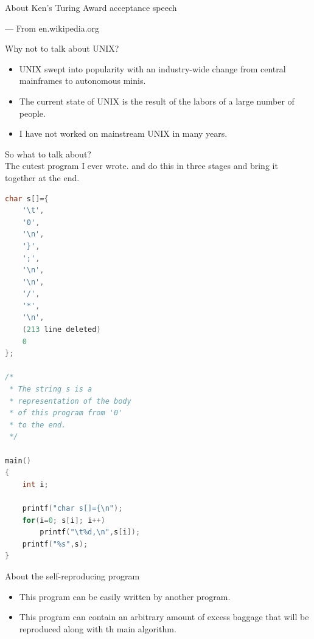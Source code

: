 \documentclass[CJK]{beamer}
\begin{document}
\begin{CJK*}{UTF8}{gbsn}
\begin{frame}{About Ken's Turing Award acceptance speech}
\begin{flushright}
	--- From en.wikipedia.org
	\end{flushright}
\end{frame}
\begin{frame}{Why not to talk about UNIX?}
	\begin{itemize}
		\item UNIX swept into popularity with an industry-wide change from central mainframes to autonomous minis.
		\item The current state of UNIX is the result of the labors of a large number of people.
		\item I have not worked on mainstream UNIX in many years.
	\end{itemize}
	\begin{block}{}
	\begin{center}
	So what to talk about?\\
	The cutest program I ever wrote. and do this in three stages and bring it together at the end.
	\end{center}
	\end{block}
\end{frame}

{\tiny
\begin{lstlisting}[language=C,caption=Stage I "a self-reproducing program",label=ccode,keywordstyle=\color{blue!70}, commentstyle=\color{red!50!green!50!blue!50}, frame=shadowbox, rulesepcolor=\color{red!20!green!20!blue!20}]
char s[]={
	'\t',
	'0',
	'\n',
	'}',
	';',
	'\n',
	'\n',
	'/',
	'*',
	'\n',
	(213 line deleted)
	0
};

/*
 * The string s is a
 * representation of the body
 * of this program from '0'
 * to the end.
 */

main()
{
	int i;
	
	printf("char s[]={\n");
	for(i=0; s[i]; i++)
		printf("\t%d,\n",s[i]);
	printf("%s",s);
}
\end{lstlisting}
}

\begin{frame}{About the self-reproducing program}
	\begin{itemize}
		\item This program can be easily written by another program.
		\item This program can contain an arbitrary amount of excess baggage that will be reproduced along with th main algorithm.
	\end{itemize}
\end{frame}


\end{CJK*}
\end{document}
